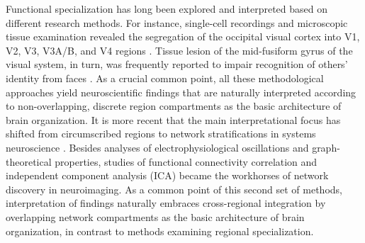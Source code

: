 \documentclass{article}
\begin{document}
Functional specialization has long been
explored and interpreted based on different research methods.
%
For instance,
single-cell recordings and microscopic tissue examination
revealed the
segregation of the occipital visual cortex into V1, V2, V3, V3A/B, and V4
regions
\cite{hubel1962receptive, zeki1978functional}.
Tissue lesion of the mid-fusiform gyrus of the visual system,
in turn,
was frequently reported to impair
recognition of others' identity from faces
\cite{iaria2008contrib}.
%
As a crucial common point,
all these methodological approaches
yield neuroscientific findings
that are naturally interpreted according to
non-overlapping, discrete region compartments
as the basic architecture of brain organization.
It is more recent
that the main interpretational focus has shifted
from circumscribed regions to network stratifications
in systems neuroscience \cite{yuste2015}.
%
Besides analyses of
electrophysiological oscillations
and
graph-theoretical properties,
studies of
functional connectivity correlation \cite{buckner2013opportunities} and
independent component analysis (ICA) \cite{beckmann2005}
became the workhorses of network discovery
in neuroimaging.
%
As a common point of this second set of methods,
interpretation of findings naturally embraces
cross-regional integration by
overlapping network compartments
as the basic architecture of brain organization,
in contrast to methods examining regional specialization.
\end{document}
